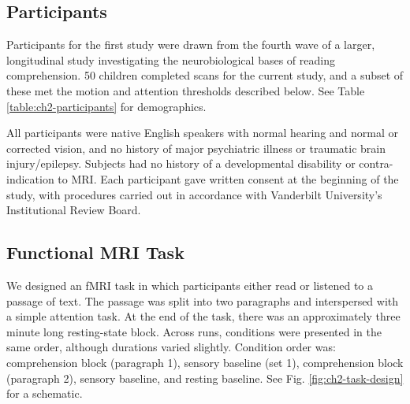 \subsection{Participants}

Participants for the first study were drawn from the fourth wave of a larger, longitudinal study investigating the neurobiological bases of reading comprehension. 50 children completed scans for the current study, and a subset of these met the motion and attention thresholds described below. See Table \ref{table:ch2-participants} for demographics. 

All participants were native English speakers with normal hearing and normal or corrected vision, and no history of major psychiatric illness or traumatic brain injury/epilepsy. Subjects had no history of a developmental disability or contra-indication to MRI.  Each participant gave written consent at the beginning of the study, with procedures carried out in accordance with Vanderbilt University’s Institutional Review Board.

\begin{table}
	\scriptsize
	\renewcommand{\tabcolsep}{0.09cm}
	\centering
	
	\caption[Participant demographics for Study 1.]
	\label{table:ch2-participants}
\end{table}


\subsection{Functional MRI Task}

We designed an fMRI task in which participants either read or listened to a passage of text. The passage was split into two paragraphs and interspersed with a simple attention task. At the end of the task, there was an approximately three minute long resting-state block. Across runs, conditions were presented in the same order, although durations varied slightly. Condition order was: comprehension block (paragraph 1), sensory baseline (set 1), comprehension block (paragraph 2), sensory baseline, and resting baseline. See Fig. \ref{fig:ch2-task-design} for a schematic.

